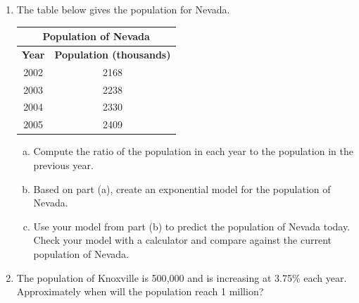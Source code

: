 \documentclass[11pt]{article}
\begin{document}
\begin{enumerate}
        \vspace{1ex}
        \noindent\rule{\textwidth}{0.8pt}
        \vspace{1ex}

        \newpage

        \item The table below gives the population for Nevada.

        \vspace{1ex}
        {\renewcommand{\arraystretch}{1.3}
        \begin{tabular}{|c|c|}
            \hline
            \multicolumn{2}{|c|}{\textbf{Population of Nevada}} \\ \hline
            \textbf{Year} & \textbf{Population (thousands)}     \\ \hline
            2002          & 2168                                \\ \hline
            2003          & 2238                                \\ \hline
            2004          & 2330                                \\ \hline
            2005          & 2409                                \\ \hline
        \end{tabular}}

        \vspace{1ex}

        \begin{enumerate}[(a)]
            \item Compute the ratio of the population in each year to the population in the previous year.\\[3ex]
            \item Based on part (a), create an exponential model for the population of Nevada.\\[3ex]
            \item Use your model from part (b) to predict the population of Nevada today. Check your model with a calculator and compare against the current population of Nevada.
        \end{enumerate}

        \vspace{20ex}

        \item The population of Knoxville is 500{,}000 and is increasing at 3.75\% each year. Approximately when will the population reach 1 million?

        \vspace{26ex}


\end{enumerate}
\end{document}
